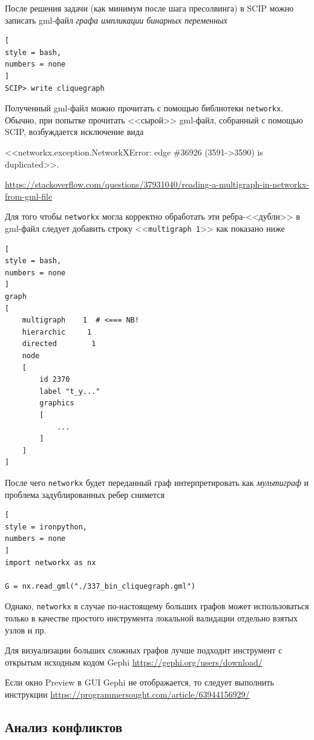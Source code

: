 \documentclass[%
	11pt,
	a4paper,
	utf8,
		]{article}
\begin{document}
После решения задачи (как минимум после шага пресолвинга) в SCIP можно записать gml-файл \emph{графа импликации бинарных переменных}
\begin{lstlisting}[
style = bash,
numbers = none
]
SCIP> write cliquegraph
\end{lstlisting}

Полученный gml-файл можно прочитать с помощью библиотеки \texttt{networkx}. Обычно, при попытке прочитать <<сырой>> gml-файл, собранный с помощью SCIP,  возбуждается исключение вида

\noindent<<networkx.exception.NetworkXError: edge \#36926 (3591->3590) is duplicated>>.

\noindent\url{https://stackoverflow.com/questions/37931040/reading-a-multigraph-in-networkx-from-gml-file}

Для того чтобы \texttt{networkx} могла корректно обработать эти ребра-<<дубли>> в gml-файл следует добавить строку <<\verb|multigraph 1|>> как показано ниже
\begin{lstlisting}[
style = bash,
numbers = none	
]
graph
[
    multigraph    1  # <=== NB!
    hierarchic     1
    directed        1
    node
    [
        id 2370
        label "t_y..."
        graphics
        [
            ...
        ]
    ]
]
\end{lstlisting}

После чего \verb|networkx| будет переданный граф интерпретировать как \emph{мультиграф} и проблема задублированных ребер снимется

\begin{lstlisting}[
style = ironpython,
numbers = none	
]
import networkx as nx

G = nx.read_gml("./337_bin_cliquegraph.gml")
\end{lstlisting}

Однако, \verb|networkx| в случае по-настоящему больших графов может использоваться только в качестве простого инструмента локальной валидации отдельно взятых узлов и пр.

Для визуализации больших сложных графов лучше подходит инструмент с открытым исходным кодом Gephi \url{https://gephi.org/users/download/}

Если окно Preview в GUI Gephi не отображается, то следует выполнить инструкции \url{https://programmersought.com/article/63944156929/}

\subsection{Анализ конфликтов}
\end{document}
